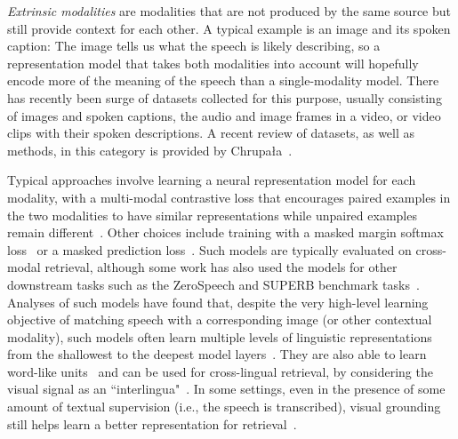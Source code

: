 \textit{Extrinsic modalities} are modalities that are not produced by the same source but still provide context for each other. A typical example is an image and its spoken caption: The image tells us what the speech is likely describing, so a representation model that takes both modalities into account will hopefully encode more of the meaning of the speech than a single-modality model. 
There has recently been  surge of datasets collected for this purpose, usually consisting of images and spoken captions, the audio and image frames in a video, or video clips with their spoken descriptions. A recent review of datasets, as well as methods, in this category is provided by Chrupa\l{}a~\cite{chrupala2021visually}. 

Typical approaches involve learning a neural representation model for each modality, with a multi-modal contrastive loss that encourages paired examples in the two modalities to have similar representations while unpaired examples remain different~\cite{synnaeve+etal_nipsworkshop14,harwath+etal_nips16,harwath+glass_asru15,merkx2019language,rouditchenko2020avlnet,peng2022fast}. 
Other choices include training with a masked margin softmax loss~\cite{ilharco2019large,sanabria2021talk} or a masked prediction loss~\cite{MultimodelAmazonICASSP22}.  Such models are typically evaluated on cross-modal retrieval, although some work has also used the models for other downstream tasks such as the ZeroSpeech and SUPERB benchmark tasks~\cite{peng2022self}. 
Analyses of such models have found that, despite the very high-level learning objective of matching speech with a corresponding image (or other contextual modality), such models often learn multiple levels of linguistic representations from the shallowest to the deepest model layers~\cite{harwath2019learning,chrupala2017representations,scharenborg+etal_icassp18}.  They are also able to learn word-like units~\cite{harwath2018jointly,peng2022word,wang2020dnn} and can be used for cross-lingual retrieval, by considering the visual signal as an ``interlingua"~\cite{harwath2018vision,havard2019models,kamper+roth_sltu18}. 
In some settings, even in the presence of some amount of textual supervision (i.e., the speech is transcribed), visual grounding still helps learn a better representation for retrieval~\cite{pasad2019contributions}. 


